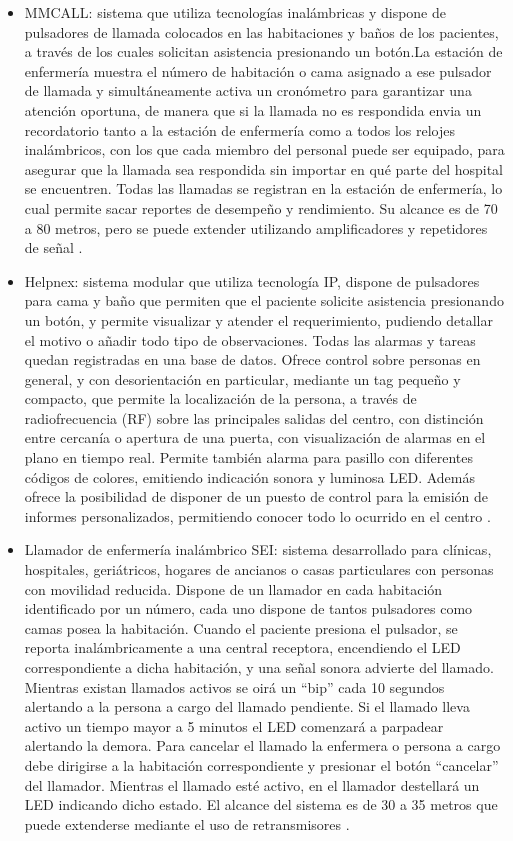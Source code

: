 \begin{itemize}
\item MMCALL: sistema que utiliza tecnologías inalámbricas y dispone de pulsadores de llamada colocados en las habitaciones y baños de los pacientes, a través de los cuales solicitan asistencia presionando un botón.La estación de enfermería muestra el número de habitación o cama asignado a ese pulsador de llamada y simultáneamente activa un cronómetro para garantizar una atención oportuna, de manera que si la llamada no es respondida envia un recordatorio tanto a la estación de enfermería como a todos los relojes inalámbricos, con los que cada miembro del personal puede ser equipado, para asegurar que la llamada sea respondida sin importar en qué parte del hospital se encuentren. Todas las llamadas se registran en la estación de enfermería, lo cual permite sacar reportes de desempeño y rendimiento. Su alcance es de 70 a 80 metros, pero se puede extender utilizando amplificadores y repetidores de señal \cite{3}.	

\item Helpnex: sistema modular que utiliza tecnología IP, dispone de pulsadores para cama y baño que permiten que el paciente solicite asistencia presionando un botón, y permite visualizar y atender el requerimiento, pudiendo detallar el motivo o añadir todo tipo de observaciones. Todas las alarmas y tareas quedan registradas en una base de datos. Ofrece control sobre personas en general, y con desorientación en particular, mediante un tag pequeño y compacto, que permite la localización de la persona, a través de radiofrecuencia (RF) sobre las principales salidas del centro, con distinción entre cercanía o apertura de una puerta, con visualización de alarmas en el plano en tiempo real. Permite también alarma para pasillo con diferentes códigos de colores, emitiendo indicación sonora y luminosa LED. Además ofrece la posibilidad de disponer de un puesto de control para la emisión de informes personalizados, permitiendo conocer todo lo ocurrido en el centro \cite{4}.

\item Llamador de enfermería inalámbrico SEI: sistema desarrollado para clínicas, hospitales, geriátricos, hogares de ancianos o casas particulares con personas con movilidad reducida. Dispone de un llamador en cada habitación identificado por un número, cada uno dispone de tantos pulsadores como camas posea la habitación. Cuando el paciente presiona el pulsador, se reporta inalámbricamente a una central receptora, encendiendo el LED correspondiente a dicha habitación, y una señal sonora advierte del llamado. Mientras existan llamados activos se oirá un “bip” cada 10 segundos alertando a la persona a cargo del llamado pendiente. Si el llamado lleva activo un tiempo mayor a 5 minutos el LED comenzará a parpadear alertando la demora. Para cancelar el llamado la enfermera o persona a cargo debe dirigirse a la habitación correspondiente y presionar el botón “cancelar” del llamador. Mientras el llamado esté activo, en el llamador destellará un LED indicando dicho estado. El alcance del sistema es de 30 a 35 metros que puede extenderse mediante el uso de retransmisores \cite{5}.

\end{itemize}

